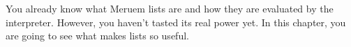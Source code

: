 You already know what Meruem lists are and how they are evaluated by the interpreter. However, you haven't tasted its real power yet. In this chapter, you are going to see what makes lists so useful.


